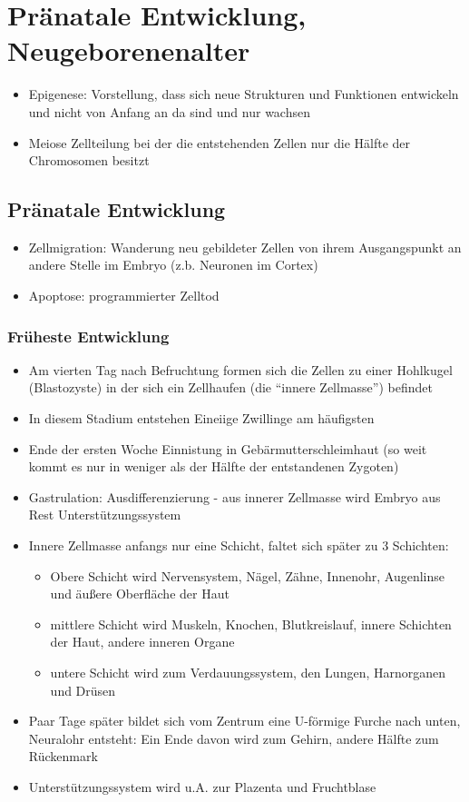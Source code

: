 
\section{Pränatale Entwicklung, Neugeborenenalter}
\begin{itemize}
	\item
		Epigenese: Vorstellung, dass sich neue Strukturen und Funktionen entwickeln und nicht von Anfang an da sind und nur wachsen
	\item
		Meiose Zellteilung bei der die entstehenden Zellen nur die Hälfte der Chromosomen besitzt
\end{itemize}

\subsection{Pränatale Entwicklung}
\begin{itemize}
	\item
		Zellmigration: Wanderung neu gebildeter Zellen von ihrem Ausgangspunkt an andere Stelle im Embryo (z.b. Neuronen im Cortex)
	\item
		Apoptose: programmierter Zelltod
\end{itemize}

\subsubsection{Früheste Entwicklung}
\begin{itemize}
	\item
		Am vierten Tag nach Befruchtung formen sich die Zellen zu einer Hohlkugel (Blastozyste) in der sich ein Zellhaufen (die \enquote{innere Zellmasse}) befindet
	\item
		In diesem Stadium entstehen Eineiige Zwillinge am häufigsten
	\item
		Ende der ersten Woche Einnistung in Gebärmutterschleimhaut (so weit kommt es nur in weniger als der Hälfte der entstandenen Zygoten)
	\item
		Gastrulation: Ausdifferenzierung - aus innerer Zellmasse wird Embryo aus Rest Unterstützungssystem
	\item
		Innere Zellmasse anfangs nur eine Schicht, faltet sich später zu 3 Schichten:
		\begin{itemize}
			\item
				Obere Schicht wird Nervensystem, Nägel, Zähne, Innenohr, Augenlinse und äußere Oberfläche der Haut
			\item
				mittlere Schicht wird Muskeln, Knochen, Blutkreislauf, innere Schichten der Haut, andere inneren Organe
			\item
				untere Schicht wird zum Verdauungssystem, den Lungen, Harnorganen und Drüsen
		\end{itemize}
	\item
		Paar Tage später bildet sich vom Zentrum eine U-förmige Furche nach unten, Neuralohr entsteht: Ein Ende davon wird zum Gehirn, andere Hälfte zum Rückenmark
	\item
		Unterstützungssystem wird u.A. zur Plazenta und Fruchtblase
\end{itemize}

